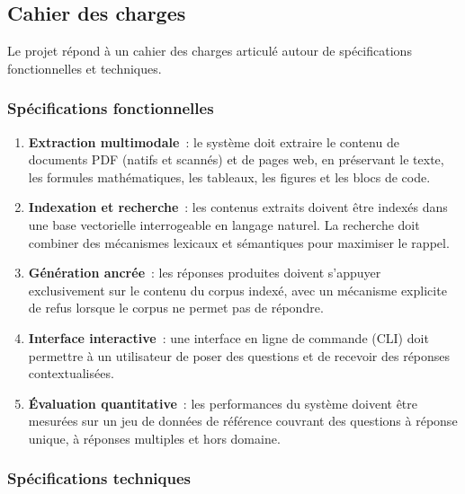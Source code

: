 \documentclass[11pt,a4paper]{article}
\begin{document}
\subsection{Cahier des charges}
\label{sec:cahier-des-charges}

Le projet répond à un cahier des charges articulé autour de spécifications fonctionnelles et techniques.

\subsubsection{Spécifications fonctionnelles}

\begin{enumerate}
  \item \textbf{Extraction multimodale}~: le système doit extraire le contenu de documents PDF (natifs et scannés) et de pages web, en préservant le texte, les formules mathématiques, les tableaux, les figures et les blocs de code.
  \item \textbf{Indexation et recherche}~: les contenus extraits doivent être indexés dans une base vectorielle interrogeable en langage naturel. La recherche doit combiner des mécanismes lexicaux et sémantiques pour maximiser le rappel.
  \item \textbf{Génération ancrée}~: les réponses produites doivent s'appuyer exclusivement sur le contenu du corpus indexé, avec un mécanisme explicite de refus lorsque le corpus ne permet pas de répondre.
  \item \textbf{Interface interactive}~: une interface en ligne de commande (CLI) doit permettre à un utilisateur de poser des questions et de recevoir des réponses contextualisées.
  \item \textbf{Évaluation quantitative}~: les performances du système doivent être mesurées sur un jeu de données de référence couvrant des questions à réponse unique, à réponses multiples et hors domaine.
\end{enumerate}

\subsubsection{Spécifications techniques}
\end{document}
